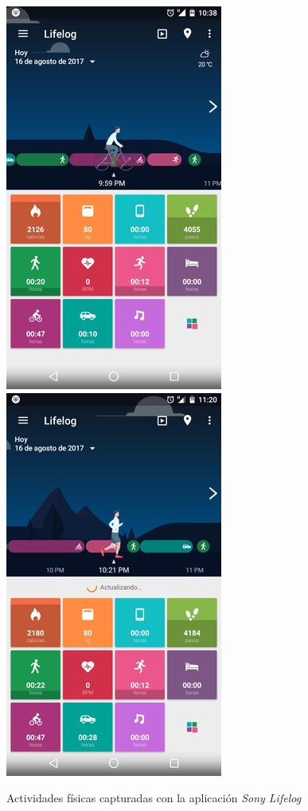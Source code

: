 \begin{figure}[th]
\begin{centering}
\includegraphics[scale=0.6]{capitulo-6/graphics/lifelog1} \includegraphics[scale=0.6]{capitulo-6/graphics/lifelog2}
\par\end{centering}
\caption[Actividades reconocidas con \emph{Sony Lifelog}]{\label{fig6:vlifelog}Actividades físicas capturadas con la aplicación
\emph{Sony Lifelog}}
\end{figure}


